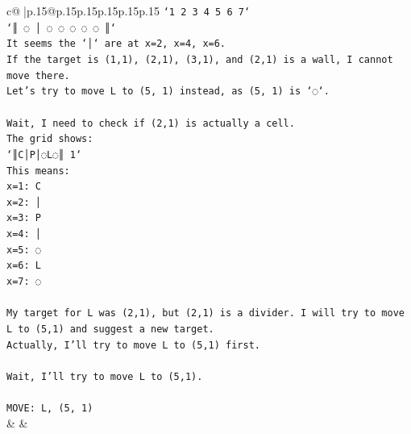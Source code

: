 \documentclass{article}
\begin{document}
{\begin{supertabular}{c@{$\;$}|p{.15\linewidth}@{}p{.15\linewidth}p{.15\linewidth}p{.15\linewidth}p{.15\linewidth}p{.15\linewidth}}
{{{\texttt{`1 2 3 4 5 6 7`} \\
\texttt{`║ ◌ │ ◌ ◌ ◌ ◌ ◌ ║`} \\
\texttt{It seems the `│` are at x=2, x=4, x=6.} \\
\texttt{If the target is (1,1), (2,1), (3,1), and (2,1) is a wall, I cannot move there.} \\
\texttt{Let's try to move L to (5, 1) instead, as (5, 1) is `◌`.} \\
\\ 
\texttt{Wait, I need to check if (2,1) is actually a cell.} \\
\texttt{The grid shows:} \\
\texttt{`║C│P│◌L◌║ 1`} \\
\texttt{This means:} \\
\texttt{x=1: C} \\
\texttt{x=2: │} \\
\texttt{x=3: P} \\
\texttt{x=4: │} \\
\texttt{x=5: ◌} \\
\texttt{x=6: L} \\
\texttt{x=7: ◌} \\
\\ 
\texttt{My target for L was (2,1), but (2,1) is a divider. I will try to move L to (5,1) and suggest a new target.} \\
\texttt{Actually, I'll try to move L to (5,1) first.} \\
\\ 
\texttt{Wait, I'll try to move L to (5,1).} \\
\\ 
\texttt{MOVE: L, (5, 1)} \\
            }
        }
    }
    & & \\ \\


\end{supertabular}}
\end{document}

